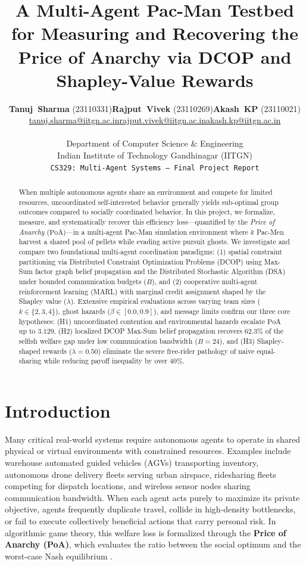 \documentclass{article}
\title{A Multi-Agent Pac-Man Testbed for Measuring and Recovering the Price of Anarchy via DCOP and Shapley-Value Rewards}
\author{
\begin{tabular}{ccc}
\textbf{Tanuj~Sharma} (23110331) & \textbf{Rajput~Vivek} (23110269) & \textbf{Akash~KP} (23110021) \\
\href{mailto:tanuj.sharma@iitgn.ac.in}{tanuj.sharma@iitgn.ac.in} &
\href{mailto:rajput.vivek@iitgn.ac.in}{rajput.vivek@iitgn.ac.in} &
\href{mailto:akash.kp@iitgn.ac.in}{akash.kp@iitgn.ac.in}
\end{tabular}
\\[0.5em]
Department of Computer Science \& Engineering \\
Indian Institute of Technology Gandhinagar (IITGN) \\[0.2em]
\texttt{CS329: Multi-Agent Systems --- Final Project Report}
}
\newcommand{\PoA}{\mathrm{PoA}}
\begin{document}
\maketitle
\vspace{-2.5em}

\begin{abstract}
When multiple autonomous agents share an environment and compete for limited resources, uncoordinated self-interested behavior generally yields sub-optimal group outcomes compared to socially coordinated behavior. In this project, we formalize, measure, and systematically recover this efficiency loss---quantified by the \emph{Price of Anarchy} ($\PoA$)---in a multi-agent Pac-Man simulation environment where $k$ Pac-Men harvest a shared pool of pellets while evading active pursuit ghosts. We investigate and compare two foundational multi-agent coordination paradigms: (1) spatial constraint partitioning via Distributed Constraint Optimization Problems (DCOP) using Max-Sum factor graph belief propagation and the Distributed Stochastic Algorithm (DSA) under bounded communication budgets ($B$), and (2) cooperative multi-agent reinforcement learning (MARL) with marginal credit assignment shaped by the Shapley value ($\lambda$). Extensive empirical evaluations across varying team sizes ($k \in \{2, 3, 4\}$), ghost hazards ($\beta \in [0.0, 0.9]$), and message limits confirm our three core hypotheses: (H1) uncoordinated contention and environmental hazards escalate $\PoA$ up to $3.129$, (H2) localized DCOP Max-Sum belief propagation recovers $62.3\%$ of the selfish welfare gap under low communication bandwidth ($B=24$), and (H3) Shapley-shaped rewards ($\lambda=0.50$) eliminate the severe free-rider pathology of naive equal-sharing while reducing payoff inequality by over $40\%$.
\end{abstract}


\section{Introduction}

Many critical real-world systems require autonomous agents to operate in shared physical or virtual environments with constrained resources. Examples include warehouse automated guided vehicles (AGVs) transporting inventory, autonomous drone delivery fleets serving urban airspace, ridesharing fleets competing for dispatch locations, and wireless sensor nodes sharing communication bandwidth. When each agent acts purely to maximize its private objective, agents frequently duplicate travel, collide in high-density bottlenecks, or fail to execute collectively beneficial actions that carry personal risk. In algorithmic game theory, this welfare loss is formalized through the \textbf{Price of Anarchy (PoA)}, which evaluates the ratio between the social optimum and the worst-case Nash equilibrium \cite{koutsoupias1999worst,roughgarden2002bad}.
\end{document}
